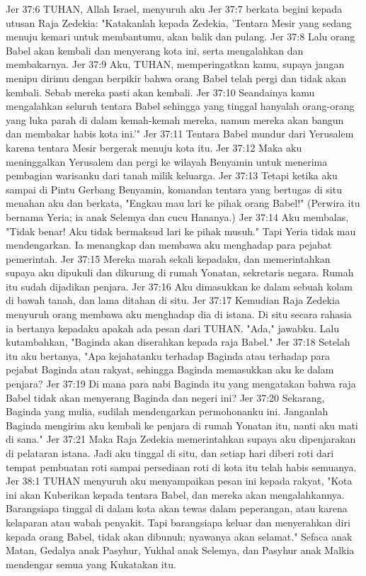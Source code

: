 Jer 37:6  TUHAN, Allah Israel, menyuruh aku
Jer 37:7  berkata begini kepada utusan Raja Zedekia: "Katakanlah kepada Zedekia, 'Tentara Mesir yang sedang menuju kemari untuk membantumu, akan balik dan pulang.
Jer 37:8  Lalu orang Babel akan kembali dan menyerang kota ini, serta mengalahkan dan membakarnya.
Jer 37:9  Aku, TUHAN, memperingatkan kamu, supaya jangan menipu dirimu dengan berpikir bahwa orang Babel telah pergi dan tidak akan kembali. Sebab mereka pasti akan kembali.
Jer 37:10  Seandainya kamu mengalahkan seluruh tentara Babel sehingga yang tinggal hanyalah orang-orang yang luka parah di dalam kemah-kemah mereka, namun mereka akan bangun dan membakar habis kota ini.'"
Jer 37:11  Tentara Babel mundur dari Yerusalem karena tentara Mesir bergerak menuju kota itu.
Jer 37:12  Maka aku meninggalkan Yerusalem dan pergi ke wilayah Benyamin untuk menerima pembagian warisanku dari tanah milik keluarga.
Jer 37:13  Tetapi ketika aku sampai di Pintu Gerbang Benyamin, komandan tentara yang bertugas di situ menahan aku dan berkata, "Engkau mau lari ke pihak orang Babel!" (Perwira itu bernama Yeria; ia anak Selemya dan cucu Hananya.)
Jer 37:14  Aku membalas, "Tidak benar! Aku tidak bermaksud lari ke pihak musuh." Tapi Yeria tidak mau mendengarkan. Ia menangkap dan membawa aku menghadap para pejabat pemerintah.
Jer 37:15  Mereka marah sekali kepadaku, dan memerintahkan supaya aku dipukuli dan dikurung di rumah Yonatan, sekretaris negara. Rumah itu sudah dijadikan penjara.
Jer 37:16  Aku dimasukkan ke dalam sebuah kolam di bawah tanah, dan lama ditahan di situ.
Jer 37:17  Kemudian Raja Zedekia menyuruh orang membawa aku menghadap dia di istana. Di situ secara rahasia ia bertanya kepadaku apakah ada pesan dari TUHAN. "Ada," jawabku. Lalu kutambahkan, "Baginda akan diserahkan kepada raja Babel."
Jer 37:18  Setelah itu aku bertanya, "Apa kejahatanku terhadap Baginda atau terhadap para pejabat Baginda atau rakyat, sehingga Baginda memasukkan aku ke dalam penjara?
Jer 37:19  Di mana para nabi Baginda itu yang mengatakan bahwa raja Babel tidak akan menyerang Baginda dan negeri ini?
Jer 37:20  Sekarang, Baginda yang mulia, sudilah mendengarkan permohonanku ini. Janganlah Baginda mengirim aku kembali ke penjara di rumah Yonatan itu, nanti aku mati di sana."
Jer 37:21  Maka Raja Zedekia memerintahkan supaya aku dipenjarakan di pelataran istana. Jadi aku tinggal di situ, dan setiap hari diberi roti dari tempat pembuatan roti sampai persediaan roti di kota itu telah habis semuanya.
Jer 38:1  TUHAN menyuruh aku menyampaikan pesan ini kepada rakyat, "Kota ini akan Kuberikan kepada tentara Babel, dan mereka akan mengalahkannya. Barangsiapa tinggal di dalam kota akan tewas dalam peperangan, atau karena kelaparan atau wabah penyakit. Tapi barangsiapa keluar dan menyerahkan diri kepada orang Babel, tidak akan dibunuh; nyawanya akan selamat." Sefaca anak Matan, Gedalya anak Pasyhur, Yukhal anak Selemya, dan Pasyhur anak Malkia mendengar semua yang Kukatakan itu.
